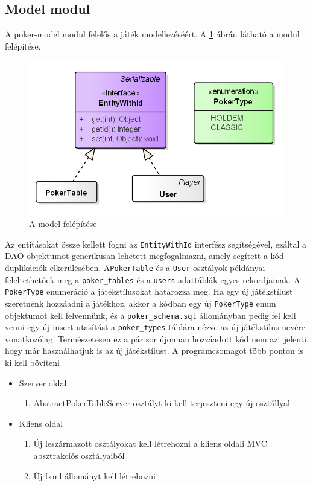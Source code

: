 \subsection{Model modul} \label{sec:poker-model}
A poker-model modul felelős a játék modellezéséért. A \ref{fig:model} ábrán látható a modul felépítése. 
\begin{figure}[h!]
	\caption{A model felépítése}
	\label{fig:model}
	\centering
	\includegraphics[width=\linewidth]{developer-documentation/images/model.png}
\end{figure}
Az entitásokat össze kellett fogni az \texttt{EntityWithId} interfész segítségével, ezáltal a DAO objektumot generikusan lehetett megfogalmazni, amely segített a kód duplikációk elkerülésében. A\texttt{PokerTable} és a \texttt{User} osztályok példányai feleltethetőek meg a \texttt{poker\_tables} és a \texttt{users} adattáblák egyes rekordjainak. A \texttt{PokerType} enumeráció a játékstílusokat határozza meg. Ha egy új játékstílust szeretnénk hozzáadni a játékhoz, akkor a kódban egy új \texttt{PokerType} enum objektumot kell felvennünk, és a \texttt{poker\_schema.sql} állományban pedig fel kell venni egy új insert utasítást a \texttt{poker\_types} táblára nézve az új játékstílus nevére vonatkozólag. Természetesen ez a pár sor újonnan hozzáadott kód nem azt jelenti, hogy már használhatjuk is az új játékstílust. A programcsomagot több ponton is ki kell bővíteni
\begin{itemize}[leftmargin=2cm]
	\item Szerver oldal
		\begin{enumerate}
			\item AbstractPokerTableServer osztályt ki kell terjeszteni egy új osztállyal
		\end{enumerate}
	\item Kliens oldal
		\begin{enumerate}
			\item Új leszármazott osztályokat kell létrehozni a kliens oldali MVC absztrakciós osztályaiból
			\item Új fxml állományt kell létrehozni
		\end{enumerate}
\end{itemize}

